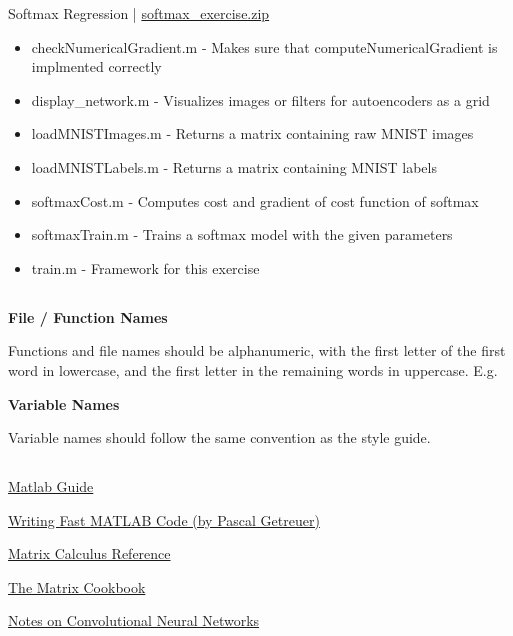 Softmax Regression | \href{http://ufldl.stanford.edu/wiki/resources/softmax_exercise.zip}{softmax\_exercise.zip}

\begin{itemize}
  \item checkNumericalGradient.m - Makes sure that computeNumericalGradient is implmented correctly
  \item display\_network.m - Visualizes images or filters for autoencoders as a grid
  \item loadMNISTImages.m - Returns a matrix containing raw MNIST images
  \item loadMNISTLabels.m - Returns a matrix containing MNIST labels
  \item softmaxCost.m - Computes cost and gradient of cost function of softmax
  \item softmaxTrain.m - Trains a softmax model with the given parameters
  \item train.m - Framework for this exercise 
\end{itemize}


\subsection{}


\textbf{File / Function Names}

Functions and file names should be alphanumeric, with the first letter of the first word in lowercase, and the first letter in the remaining words in uppercase. E.g.


\textbf{Variable Names}

Variable names should follow the same convention as the style guide. 



\subsection{} \label{chp:usefullinks}


\href{http://www.stat.berkeley.edu/~spector/matlab.pdf}{Matlab Guide}

\href{http://www.mathworks.com/matlabcentral/fx_files/5685/2/matopt.zip}{Writing Fast MATLAB Code (by Pascal Getreuer)}

\href{http://www.psi.toronto.edu/matrix/calculus.html}{Matrix Calculus Reference}

\href{http://www.imm.dtu.dk/pubdb/views/edoc_download.php/3274/pdf/imm3274.pdf}{The Matrix Cookbook}

\href{http://www.math.duke.edu/~jvb/papers/cnn_tutorial.pdf}{Notes on Convolutional Neural Networks}

